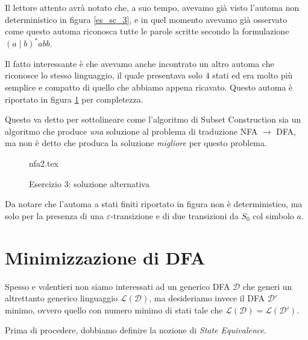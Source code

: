 \documentclass[class=book, crop=false, oneside, 12pt]{standalone}
\begin{document}
Il lettore attento avrà notato che, a suo tempo, avevamo già visto l'automa non deterministico in figura \ref{es_sc_3}, e in quel momento avevamo già osservato come questo automa riconosca tutte le parole scritte secondo la formulazione \((a \mid b)^* abb\).

Il fatto interessante è che avevamo anche incontrato un altro automa che riconosce lo stesso linguaggio, il quale presentava solo \(4\) stati ed era molto più semplice e compatto di quello che abbiamo appena ricavato. Questo automa è riportato in figura \ref{sol_sc_3_v2} per completezza.

Questo va detto per sottolineare come l'algoritmo di Subset Construction sia un algoritmo che produce \emph{una} soluzione al problema di traduzione NFA \(\to\) DFA, ma non è detto che produca la soluzione \emph{migliore} per questo problema.

\begin{figure}[H]
    \centering
    {nfa2.tex}
    \caption{Esercizio 3: soluzione alternativa}
    \label{sol_sc_3_v2}
\end{figure}

Da notare che l'automa a stati finiti riportato in figura non è deterministico, ma solo per la presenza di una \(\varepsilon\)-transizione e di due transizioni da \(S_{0}\) col simbolo \(a\).

\section{Minimizzazione di DFA}
Spesso e volentieri non siamo interessati ad un generico DFA \(\mathcal{D}\) che generi un altrettanto generico linguaggio \(\mathcal{L(D)}\), ma desideriamo invece il DFA \(\mathcal{D}'\) minimo, ovvero quello con numero minimo di stati tale che \(\mathcal{L(D)} = \mathcal{L(D')}\). 

Prima di procedere, dobbiamo definire la nozione di \emph{State Equivalence}.
\end{document}

